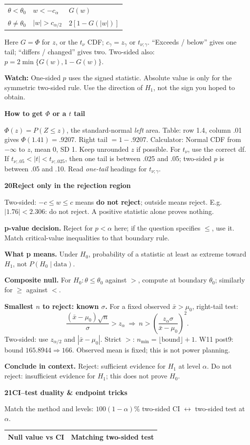 \documentclass[a4paper,landscape]{article}
\newcommand{\head}[2][late]{\par\vspace{3pt}\noindent\colorbox{#1}{\parbox{\dimexpr\linewidth-6pt}{\color{white}\bfseries #2}}\par\vspace{1pt}}
\newcommand{\cue}[1]{\par\textbf{#1}\enspace}
\newcommand{\trap}[1]{\par{\color{alert}\textbf{Watch:} #1}}
\newcommand{\xb}{\bar x}
\newcommand{\tblhead}[1]{\textbf{#1}}
\newcommand{\subhead}[1]{\par\vspace{2pt}\textcolor{late}{\textbf{#1}}\par}
\begin{document}
\begin{multicols*}{4}
\begin{tabular}{@{}L{.25\linewidth}L{.33\linewidth}L{.32\linewidth}@{}}
\(\theta<\theta_0\) & \(w<-c_\alpha\) & \(G(w)\)\\
\(\theta\ne\theta_0\) & \(|w|>c_{\alpha/2}\) & \(2[1-G(|w|)]\)
\end{tabular}
Here \(G=\Phi\) for \(z\), or the \(t_\nu\) CDF; \(c_\gamma=z_\gamma\) or \(t_{\nu;\gamma}\).
``Exceeds / below'' gives one tail; ``differs / changed'' gives two. Two-sided also: \(p=2\min\{G(w),1-G(w)\}\).
\trap{One-sided \(p\) uses the signed statistic. Absolute value is only for the symmetric two-sided rule. Use the direction of \(H_1\), not the sign you hoped to obtain.}
\subhead{How to get \(\Phi\) or a \(t\) tail}
\(\Phi(z)=P(Z\le z)\), the standard-normal \emph{left} area. Table: row 1.4, column .01 gives \(\Phi(1.41)=.9207\). Right tail \(=1-.9207\). Calculator: Normal CDF from \(-\infty\) to \(z\), mean 0, SD 1. Keep unrounded \(z\) if possible.
For \(t_\nu\), use the correct df. If \(t_{\nu;.05}<|t|<t_{\nu;.025}\), then one tail is between .025 and .05; two-sided \(p\) is between .05 and .10. Read \emph{one-tail} headings for \(t_{\nu;\gamma}\).
\head{20\quad Reject only in the rejection region}
Two-sided: \(-c\le w\le c\) means \textbf{do not reject}; outside means reject. E.g. \(|1.76|<2.306\): do not reject. A positive statistic alone proves nothing.
\cue{p-value decision.} Reject for \(p<\alpha\) here; if the question specifies \(\le\), use it. Match critical-value inequalities to that boundary rule.
\cue{What p means.} Under \(H_0\), probability of a statistic at least as extreme toward \(H_1\), not \(P(H_0\mid\text{data})\).
\cue{Composite null.} For \(H_0:\theta\le\theta_0\) against \(>\), compute at boundary \(\theta_0\); similarly for \(\ge\) against \(<\).
\cue{Smallest \(n\) to reject: known \(\sigma\).} For a fixed observed \(\xb>\mu_0\), right-tail test:
\[\frac{(\xb-\mu_0)\sqrt n}{\sigma}>z_\alpha
\ \Rightarrow\ n>\left(\frac{z_\alpha\sigma}{\xb-\mu_0}\right)^2.\]
Two-sided: use \(z_{\alpha/2}\) and \(|\xb-\mu_0|\). Strict \(>\): \(n_{\min}=\lfloor\text{bound}\rfloor+1\). W11 post9: bound \(165.8944\Rightarrow166\). Observed mean is fixed; this is not power planning.
\cue{Conclude in context.} Reject: sufficient evidence for \(H_1\) at level \(\alpha\). Do not reject: insufficient evidence for \(H_1\); this does not prove \(H_0\).
\head{21\quad CI--test duality \& endpoint tricks}
Match the method and levels: \(100(1-\alpha)\%\) two-sided CI \(\leftrightarrow\) two-sided test at \(\alpha\).
\begin{tabular}{@{}L{.44\linewidth}L{.50\linewidth}@{}}
\tblhead{Null value vs CI} & \tblhead{Matching two-sided test}\\\hline

\end{tabular}
\end{multicols*}
\end{document}
